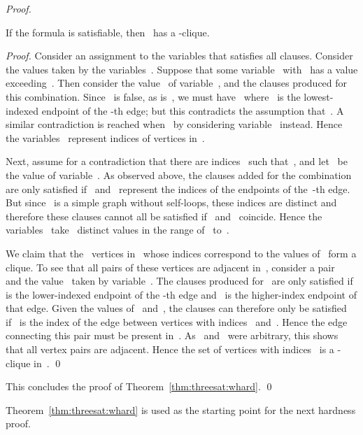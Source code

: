 \let\accentvec\vec  \documentclass{llncs}
\newcommand{\claimqed}{\renewcommand{\squareforqed}{}\qed\renewcommand{\squareforqed}{\plainsquareforqed}}
\begin{document}
\begin{proof}
\begin{claim}
If the formula is satisfiable, then~ has a -clique.
\end{claim}
\begin{proof}
Consider an assignment to the variables that satisfies all clauses. Consider the values taken by the variables~. Suppose that some variable~ with~ has a value exceeding~. Then consider the value~ of variable~, and the clauses produced for this combination. Since~ is false, as is~, we must have~ where~ is the lowest-indexed endpoint of the -th edge; but this contradicts the assumption that~. A similar contradiction is reached when~ by considering variable~ instead. Hence the variables~ represent indices of vertices in~. 

Next, assume for a contradiction that there are indices~ such that~, and let~ be the value of variable~. As observed above, the clauses added for the combination~ are only satisfied if~ and~ represent the indices of the endpoints of the~-th edge. But since~ is a simple graph without self-loops, these indices are distinct and therefore these clauses cannot all be satisfied if~ and~ coincide. Hence the variables~ take~ distinct values in the range of~ to~.

We claim that the~ vertices in~ whose indices correspond to the values of~ form a clique. To see that all pairs of these vertices are adjacent in~, consider a pair~ and the value~ taken by variable~. The clauses produced for~ are only satisfied if~ is the lower-indexed endpoint of the -th edge and~ is the higher-index endpoint of that edge. Given the values of~ and~, the clauses can therefore only be satisfied if~ is the index of the edge between vertices with indices~ and~. Hence the edge connecting this pair must be present in~. As~ and~ were arbitrary, this shows that all vertex pairs are adjacent. Hence the set of vertices with indices~ is a -clique in~.
\claimqed
\end{proof}

This concludes the proof of Theorem~\ref{thm:threesat:whard}.
\qed
\end{proof}


Theorem~\ref{thm:threesat:whard} is used as the starting point for the next hardness proof.
\end{document}

